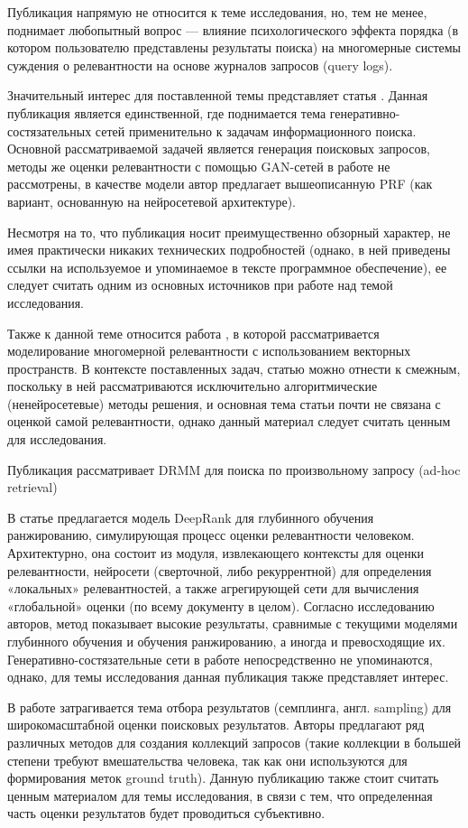 Публикация \cite{DBLP:journals/corr/abs-1807-05355} напрямую не относится к теме исследования, но, тем не менее, поднимает
любопытный вопрос — влияние психологического эффекта порядка (в котором пользователю представлены результаты поиска)
на многомерные системы суждения о релевантности на основе журналов запросов (query logs).

Значительный интерес для поставленной темы представляет статья \cite{DBLP:journals/corr/abs-1806-03577}. Данная публикация
является единственной, где поднимается тема генеративно-состязательных сетей применительно к задачам информационного поиска.
Основной рассматриваемой задачей является генерация поисковых запросов, методы же оценки релевантности с помощью GAN-сетей 
в работе не рассмотрены, в качестве модели автор предлагает вышеописанную PRF (как вариант, основанную на нейросетевой 
архитектуре).

Несмотря на то, что публикация \cite{DBLP:journals/corr/abs-1806-03577} носит преимущественно обзорный характер, не имея
практически никаких технических подробностей (однако, в ней приведены ссылки на используемое и упоминаемое в тексте 
программное обеспечение), ее следует считать одним из основных источников при работе над темой исследования.

Также к данной теме относится работа \cite{DBLP:journals/corr/abs-1805-02184}, в которой рассматривается моделирование 
многомерной релевантности с использованием векторных пространств. В контексте поставленных задач, статью можно отнести
к смежным, поскольку в ней рассматриваются исключительно алгоритмические (ненейросетевые) методы решения, и основная тема
статьи почти не связана с оценкой самой релевантности, однако данный материал следует считать ценным для исследования.

Публикация \cite{DBLP:journals/corr/abs-1711-08611} рассматривает DRMM для поиска по произвольному запросу (ad-hoc retrieval)

В статье \cite{DBLP:journals/corr/abs-1710-05649} предлагается модель DeepRank для глубинного обучения ранжированию, 
симулирующая процесс оценки релевантности человеком. Архитектурно, она состоит из модуля, извлекающего контексты для оценки
релевантности, нейросети (сверточной, либо рекуррентной) для определения «локальных» релевантностей, а также агрегирующей
сети для вычисления «глобальной» оценки (по всему документу в целом). Согласно исследованию авторов, метод показывает высокие
результаты, сравнимые с текущими моделями глубинного обучения и обучения ранжированию, а иногда и превосходящие их.
Генеративно-состязательные сети в работе непосредственно не упоминаются, однако, для темы исследования данная публикация 
также представляет интерес.

В работе \cite{DBLP:journals/corr/abs-1709-01709} затрагивается тема отбора результатов (семплинга, англ. sampling)
для широкомасштабной оценки поисковых результатов. Авторы предлагают ряд различных методов для создания коллекций запросов
(такие коллекции в большей степени требуют вмешательства человека, так как они используются для формирования меток
ground truth). Данную публикацию также стоит считать ценным материалом для темы исследования, в связи с тем, 
что определенная часть оценки результатов будет проводиться субъективно.